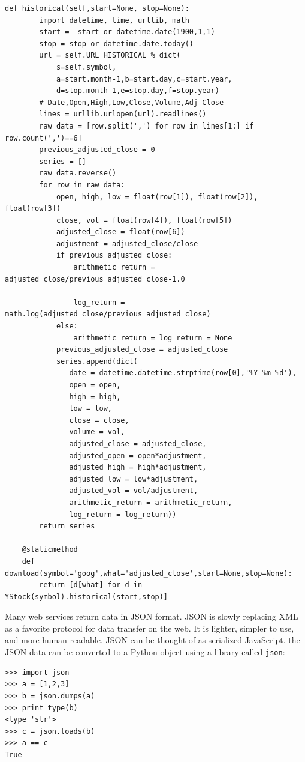 \documentclass[justified,sixbynine]{tufte-book}
\def\ft{\small\tt}
\theoremstyle{plain}%
\theoremstyle{definition}
\theoremstyle{remark}
\begin{document}
\begin{fullwidth}
\begin{lstlisting}[caption={in file: {\ft nlib.py}}]
    def historical(self,start=None, stop=None):
        import datetime, time, urllib, math
        start =  start or datetime.date(1900,1,1)
        stop = stop or datetime.date.today()
        url = self.URL_HISTORICAL % dict(
            s=self.symbol,
            a=start.month-1,b=start.day,c=start.year,
            d=stop.month-1,e=stop.day,f=stop.year)
        # Date,Open,High,Low,Close,Volume,Adj Close
        lines = urllib.urlopen(url).readlines()
        raw_data = [row.split(',') for row in lines[1:] if row.count(',')==6]
        previous_adjusted_close = 0
        series = []
        raw_data.reverse()
        for row in raw_data:
            open, high, low = float(row[1]), float(row[2]), float(row[3])
            close, vol = float(row[4]), float(row[5])
            adjusted_close = float(row[6])
            adjustment = adjusted_close/close
            if previous_adjusted_close:
                arithmetic_return = adjusted_close/previous_adjusted_close-1.0

                log_return = math.log(adjusted_close/previous_adjusted_close)
            else:
                arithmetic_return = log_return = None
            previous_adjusted_close = adjusted_close
            series.append(dict(
               date = datetime.datetime.strptime(row[0],'%Y-%m-%d'),
               open = open,
               high = high,
               low = low,
               close = close,
               volume = vol,
               adjusted_close = adjusted_close,
               adjusted_open = open*adjustment,
               adjusted_high = high*adjustment,
               adjusted_low = low*adjustment,
               adjusted_vol = vol/adjustment,
               arithmetic_return = arithmetic_return,
               log_return = log_return))
        return series

    @staticmethod
    def download(symbol='goog',what='adjusted_close',start=None,stop=None):
        return [d[what] for d in YStock(symbol).historical(start,stop)]
\end{lstlisting}

Many web services return data in JSON format. JSON is slowly replacing XML as a favorite protocol for data transfer on the web. It is lighter, simpler to use, and more human readable. JSON can be thought of as serialized JavaScript. the JSON data can be converted to a Python object using a library called {\ft json}:

\begin{lstlisting}
>>> import json
>>> a = [1,2,3]
>>> b = json.dumps(a)
>>> print type(b)
<type 'str'>
>>> c = json.loads(b)
>>> a == c
True
\end{lstlisting}


\end{fullwidth}
\end{document}
